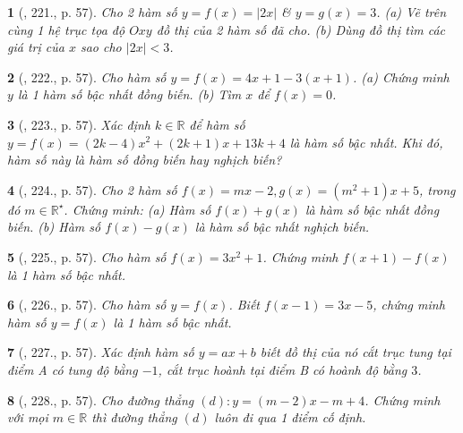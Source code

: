 \documentclass{article}
\newtheorem{baitoan}{}
\begin{document}
\begin{baitoan}[\cite{Tuyen_Toan_8}, 221., p. 57]
	Cho 2 hàm số $y = f(x) = |2x|$ \& $y = g(x) = 3$. (a) Vẽ trên cùng 1 hệ trục tọa độ $Oxy$ đồ thị của 2 hàm số đã cho. (b) Dùng đồ thị tìm các giá trị của $x$ sao cho $|2x| < 3$.
\end{baitoan}

\begin{baitoan}[\cite{Tuyen_Toan_8}, 222., p. 57]
	Cho hàm số $y = f(x) = 4x + 1 - 3(x + 1)$. (a) Chứng minh $y$ là 1 hàm số bậc nhất đồng biến. (b) Tìm $x$ để $f(x) = 0$.
\end{baitoan}

\begin{baitoan}[\cite{Tuyen_Toan_8}, 223., p. 57]
	Xác định $k\in\mathbb{R}$ để hàm số $y = f(x) = (2k - 4)x^2 + (2k + 1)x + 13k + 4$ là hàm số bậc nhất. Khi đó, hàm số này là hàm số đồng biến hay nghịch biến?
\end{baitoan}

\begin{baitoan}[\cite{Tuyen_Toan_8}, 224., p. 57]
	Cho 2 hàm số $f(x) = mx - 2,g(x) = (m^2 + 1)x + 5$, trong đó $m\in\mathbb{R}^\star$. Chứng minh: (a) Hàm số $f(x) + g(x)$ là hàm số bậc nhất đồng biến. (b) Hàm số $f(x) - g(x)$ là hàm số bậc nhất nghịch biến.
\end{baitoan}

\begin{baitoan}[\cite{Tuyen_Toan_8}, 225., p. 57]
	Cho hàm số $f(x) = 3x^2 + 1$. Chứng minh $f(x + 1) - f(x)$ là 1 hàm số bậc nhất.
\end{baitoan}

\begin{baitoan}[\cite{Tuyen_Toan_8}, 226., p. 57]
	Cho hàm số $y = f(x)$. Biết $f(x - 1) = 3x - 5$, chứng minh hàm số $y = f(x)$ là 1 hàm số bậc nhất.
\end{baitoan}

\begin{baitoan}[\cite{Tuyen_Toan_8}, 227., p. 57]
	Xác định hàm số $y = ax + b$ biết đồ thị của nó cắt trục tung tại điểm A có tung độ bằng $-1$, cắt trục hoành tại điểm B có hoành độ bằng $3$.
\end{baitoan}

\begin{baitoan}[\cite{Tuyen_Toan_8}, 228., p. 57]
	Cho đường thẳng $(d):y = (m - 2)x - m + 4$. Chứng minh với mọi $m\in\mathbb{R}$ thì đường thẳng $(d)$ luôn đi qua 1 điểm cố định.
\end{baitoan}
\end{document}

